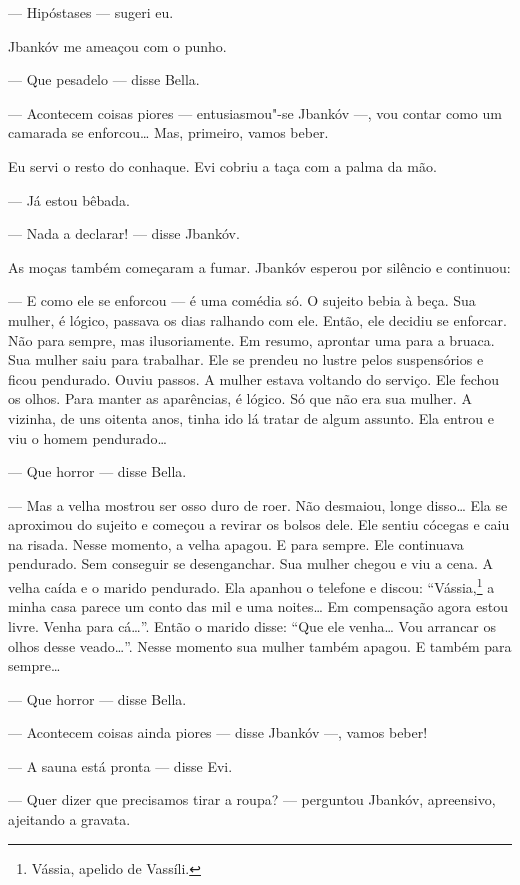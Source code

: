 --- Hipóstases --- sugeri eu.

Jbankóv me ameaçou com o punho.

--- Que pesadelo --- disse Bella.

--- Acontecem coisas piores --- entusiasmou"-se Jbankóv
---, vou contar como um camarada se enforcou\ldots{} Mas, primeiro,
vamos beber.

Eu servi o resto do conhaque. Evi cobriu a taça com a palma da mão.

--- Já estou bêbada.

--- Nada a declarar! --- disse Jbankóv.

As moças também começaram a fumar. Jbankóv esperou por silêncio e
continuou:

--- E como ele se enforcou --- é uma comédia só. O sujeito
bebia à beça. Sua mulher, é lógico, passava os dias ralhando com ele.
Então, ele decidiu se enforcar. Não para sempre, mas ilusoriamente. Em
resumo, aprontar uma para a bruaca. Sua mulher saiu para trabalhar. Ele se prendeu no
lustre pelos suspensórios e ficou pendurado. Ouviu passos. A mulher
estava voltando do serviço. Ele fechou os olhos. Para manter as
aparências, é lógico. Só que não era sua mulher. A vizinha, de uns
oitenta anos, tinha ido lá tratar de algum assunto. Ela entrou e viu o
homem pendurado\ldots{}

--- Que horror --- disse Bella.

--- Mas a velha mostrou ser osso duro de roer. Não desmaiou,
longe disso\ldots{} Ela se aproximou do sujeito e começou a revirar os bolsos
dele. Ele sentiu cócegas e caiu na risada. Nesse momento, a velha apagou.
E para sempre. Ele continuava pendurado. Sem conseguir se desenganchar.
Sua mulher chegou e viu a cena. A velha caída e o marido pendurado. Ela
apanhou o telefone e discou: ``Vássia,\footnote{Vássia, apelido de Vassíli.} a minha casa parece um conto
das mil e uma noites\ldots{} Em compensação agora estou livre. Venha
para cá\ldots{}''. Então o marido disse: ``Que ele venha\ldots{} Vou arrancar os
olhos desse veado\ldots{}''. Nesse momento sua mulher também apagou. E
também para sempre\ldots{}

--- Que horror --- disse Bella.

--- Acontecem coisas ainda piores --- disse Jbankóv
---, vamos beber!

--- A sauna está pronta --- disse Evi.

--- Quer dizer que precisamos tirar a roupa? --- perguntou
Jbankóv, apreensivo, ajeitando a gravata.

